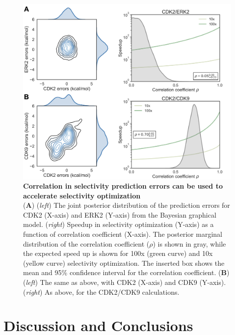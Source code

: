 \documentclass[9pt,lineno]{elife-modified} %
\begin{document}
\begin{figure}
\begin{fullwidth}
\begin{centering}
\includegraphics[width=1.0\linewidth]{figures/figure5.png}
\end{centering}
\caption{
\label{fig:figure-5}
{\bf Correlation in selectivity prediction errors can be used to accelerate selectivity optimization} \\
({\bf A}) (\emph{left}) The joint posterior distribution of the prediction errors for CDK2 (X-axis) and ERK2 (Y-axis) from the Bayesian graphical model. (\emph{right}) Speedup in selectivity optimization (Y-axis) as a function of correlation coefficient (X-axis). The posterior marginal distribution of the correlation coefficient ($\rho$) is shown in gray, while the expected speed up is shown for 100x (green curve) and 10x (yellow curve) selectivity optimization. The inserted box shows the mean and 95\% confidence interval for the correlation coefficient. 
({\bf B}) (\emph{left}) The same as above, with CDK2 (X-axis) and CDK9 (Y-axis). (\emph{right}) As above, for the CDK2/CDK9 calculations.}
\end{fullwidth}
\end{figure}


%
%
%
%
\section{Discussion and Conclusions}
	
\end{document}
